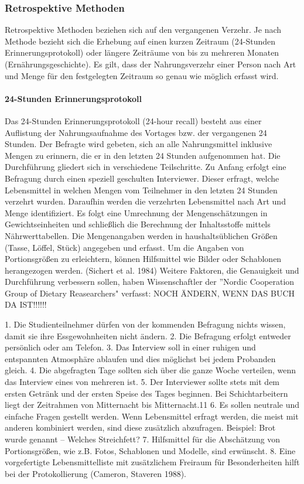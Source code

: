 \subsubsection{Retrospektive Methoden}

Retrospektive Methoden beziehen sich auf den vergangenen Verzehr.  Je nach Methode bezieht sich die Erhebung auf einen kurzen Zeitraum (24-Stunden Erinnerungsprotokoll) oder längere Zeiträume von bis zu mehreren Monaten (Ernährungsgeschichte). Es gilt, dass der Nahrungsverzehr einer Person nach Art und Menge für den festgelegten Zeitraum so genau wie möglich erfasst wird.\cite{muller2007ernahrungsmedizinische}


\paragraph{24-Stunden Erinnerungsprotokoll}

Das 24-Stunden Erinnerungsprotokoll (24-hour recall) besteht aus einer Auflistung der Nahrungsaufnahme des Vortages bzw. der vergangenen 24 Stunden. Der Befragte wird gebeten, sich an alle Nahrungsmittel inklusive Mengen zu erinnern, die er in den letzten 24 Stunden aufgenommen hat. Die Durchführung gliedert sich in verschiedene Teilschritte. Zu Anfang erfolgt eine Befragung durch einen speziell geschulten Interviewer. Dieser erfragt, welche Lebensmittel in welchen Mengen vom Teilnehmer in den letzten 24 Stunden verzehrt wurden. Daraufhin werden die verzehrten Lebensmittel nach Art und Menge identifiziert. Es folgt eine Umrechnung der Mengenschätzungen in Gewichtseinheiten und schließlich die Berechnung der Inhaltsstoffe mittels Nährwerttabellen. Die Mengenangaben werden in haushaltsüblichen Größen (Tasse, Löffel, Stück) angegeben und erfasst. Um die Angaben von Portionsgrößen zu erleichtern, können Hilfsmittel wie Bilder oder Schablonen herangezogen werden. (Sichert et al. 1984) Weitere Faktoren, die Genauigkeit und Durchführung verbessern sollen, haben Wissenschaftler der ''Nordic Cooperation Group of Dietary Reasearchers" verfasst: NOCH ÄNDERN, WENN DAS BUCH DA IST!!!!!!

1. Die Studienteilnehmer dürfen von der kommenden Befragung nichts wissen, damit
sie ihre Essgewohnheiten nicht ändern.
2. Die Befragung erfolgt entweder persönlich oder am Telefon.
3. Das Interview soll in einer ruhigen und entspannten Atmosphäre ablaufen und dies
möglichst bei jedem Probanden gleich.
4. Die abgefragten Tage sollten sich über die ganze Woche verteilen, wenn das
Interview eines von mehreren ist.
5. Der Interviewer sollte stets mit dem ersten Getränk und der ersten Speise des Tages
beginnen. Bei Schichtarbeitern liegt der Zeitrahmen von Mitternacht bis Mitternacht.11
6. Es sollen neutrale und einfache Fragen gestellt werden. Wenn Lebensmittel erfragt
werden, die meist mit anderen kombiniert werden, sind diese zusätzlich abzufragen.
Beispiel: Brot wurde genannt – Welches Streichfett?
7. Hilfsmittel für die Abschätzung von Portionsgrößen, wie z.B. Fotos, Schablonen und
Modelle, sind erwünscht.
8. Eine vorgefertigte Lebensmittelliste mit zusätzlichem Freiraum für Besonderheiten
hilft bei der Protokollierung (Cameron, Staveren 1988).


